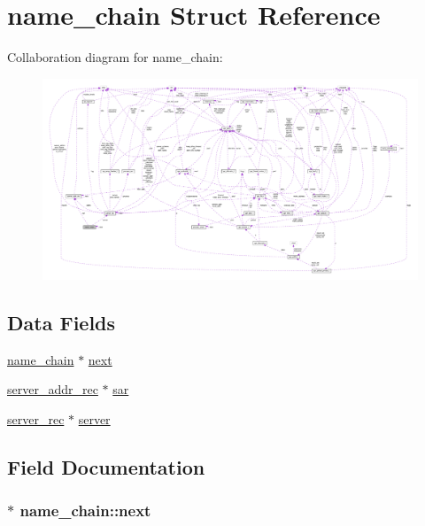 \hypertarget{structname__chain}{}\section{name\+\_\+chain Struct Reference}
\label{structname__chain}


Collaboration diagram for name\+\_\+chain\+:
\nopagebreak
\begin{figure}[H]
\begin{center}
\leavevmode
\includegraphics[width=350pt]{structname__chain__coll__graph}
\end{center}
\end{figure}
\subsection*{Data Fields}
\begin{DoxyCompactItemize}
\item 
\hyperlink{structname__chain}{name\+\_\+chain} $\ast$ \hyperlink{structname__chain_a171c5dbe15aca0893ccf30325539e0cc}{next}
\item 
\hyperlink{structserver__addr__rec}{server\+\_\+addr\+\_\+rec} $\ast$ \hyperlink{structname__chain_a4824fc24604babfccffe230d378f415e}{sar}
\item 
\hyperlink{structserver__rec}{server\+\_\+rec} $\ast$ \hyperlink{structname__chain_a4e15bcedc0bf164d6c996eeda9fb6c83}{server}
\end{DoxyCompactItemize}


\subsection{Field Documentation}
\subsubsection[{\texorpdfstring{next}{next}}]{$\ast$ name\+\_\+chain\+::next}\hypertarget{structname__chain_a171c5dbe15aca0893ccf30325539e0cc}{}\label{structname__chain_a171c5dbe15aca0893ccf30325539e0cc}
